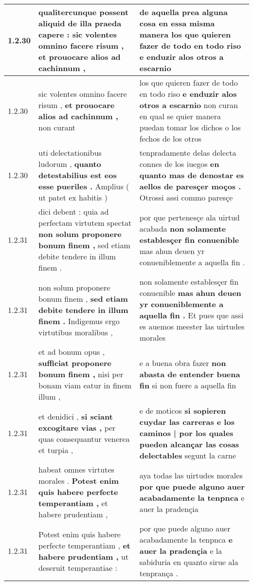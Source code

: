 \begin{tabular}{|p{1cm}|p{6.5cm}|p{6.5cm}|}
1.2.30 & qualitercunque possent aliquid de illa praeda capere : \textbf{ sic volentes omnino facere risum , } et prouocare alios ad cachinnum , & de aquella prea alguna cosa en essa misma manera \textbf{ los que quieren fazer de todo en todo riso } e enduzir alos otros a escarnio \\\hline
1.2.30 & sic volentes omnino facere risum , \textbf{ et prouocare alios ad cachinnum , } non curant & los que quieren fazer de todo en todo riso \textbf{ e enduzir alos otros a escarnio } non curan en qual se quier manera puedan tomar los dichos o los fechos de los otros \\\hline
1.2.30 & uti delectationibus ludorum , \textbf{ quanto detestabilius est eos esse pueriles . } Amplius ( ut patet ex habitis ) & tenpradamente delas delecta connes de los iuegos \textbf{ en quanto mas de denostar es aellos de paresçer moços . } Otrossi assi commo paresçe \\\hline
1.2.31 & dici debent : quia ad perfectam virtutem spectat \textbf{ non solum proponere bonum finem , } sed etiam debite tendere in illum finem . & por que pertenesçe ala uirtud acabada \textbf{ non solamente establesçer fin conuenible } mas ahun deuen yr conueniblemente a aquella fin . \\\hline
1.2.31 & non solum proponere bonum finem , \textbf{ sed etiam debite tendere in illum finem . } Indigemus ergo virtutibus moralibus , & non solamente establesçer fin conuenible \textbf{ mas ahun deuen yr conueniblemente a aquella fin . } Et pues que assi es auemos meester las uirtudes morales \\\hline
1.2.31 & et ad bonum opus , \textbf{ sufficiat proponere bonum finem , } nisi per bonam viam eatur in finem illum , & e a buena obra fazer \textbf{ non abasta de entender buena fin } si non fuere a aquella fin \\\hline
1.2.31 & et denidici , \textbf{ si sciant excogitare vias , } per quas consequantur venerea et turpia , & e de moticos \textbf{ si sopieren cuydar las carreras e los caminos | por los quales pueden alcançar las cosas delectables } segunt la carne \\\hline
1.2.31 & habeat omnes virtutes morales . \textbf{ Potest enim quis habere perfecte temperantiam , } et habere prudentiam , & aya todas las uirtudes morales \textbf{ por que puede alguno auer acabadamente la tenpnca } e auer la pradençia \\\hline
1.2.31 & Potest enim quis habere perfecte temperantiam , \textbf{ et habere prudentiam , } ut deseruit temperantiae : & por que puede alguno auer acabadamente la tenpnca \textbf{ e auer la pradençia } e la sabiduria en quanto sirue ala tenprança . \\\hline

\end{tabular}
